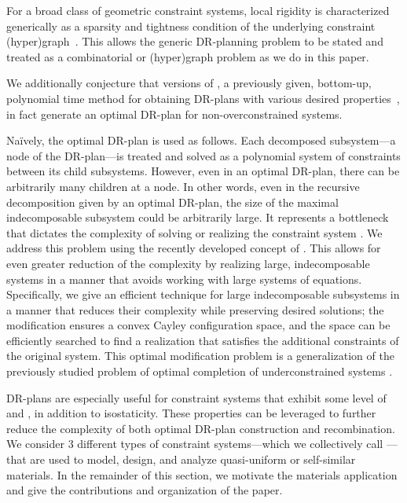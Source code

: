 For a broad class of geometric constraint systems, local rigidity is characterized generically as a sparsity and tightness condition of the underlying constraint (hyper)graph~\cite{laman1970graphs,streinu2009sparse,tay1976rigidity,white1987algebraic}. This allows the generic DR-planning problem to be stated and treated as a combinatorial or (hyper)graph problem as we do in this paper.

We additionally conjecture that versions of \frontier, a previously given, bottom-up, polynomial time method for obtaining DR-plans with various desired properties~\cite{hoffman2001decompositionI, hoffman2001decompositionII,lomonosov2004graph,sitharam2005combinatorial}, in fact generate an optimal DR-plan for non-overconstrained systems.


Na{\"i}vely, the optimal DR-plan is used as follows. Each decomposed subsystem---a node of the DR-plan---is treated and solved as a polynomial system of constraints between its child subsystems. However, even in an optimal DR-plan, there can be arbitrarily many children at a node. In other words, even in the recursive decomposition given by an optimal DR-plan, the  size of the maximal indecomposable subsystem could be arbitrarily large.  It represents a bottleneck that dictates the complexity of solving or realizing the constraint system \cite{sitharam2010optimized,sitharam2006well,sitharam2010reconciling}.  We address this problem using the recently developed concept of  \cite{sitharam2010convex,sitharam2011cayleyI,sitharam2011cayleyII,sitharam2014beast,sitharam2013caymos,wang2014cayley}. This allows for even greater reduction of the complexity by realizing large, indecomposable systems in a manner that avoids working with large systems of equations.
Specifically, we give an efficient technique for  large indecomposable subsystems in a manner that reduces their complexity while preserving desired solutions; the modification ensures a convex Cayley configuration space, and the space can be efficiently searched to find a realization that satisfies the additional constraints of the original system.
This optimal modification  problem is a generalization of the previously studied problem of optimal completion of underconstrained systems \cite{sitharam2005combinatorial,joan-arinyo2003transforming}.

DR-plans are especially useful for constraint systems that exhibit some level of  and , in addition to isostaticity.  These properties can be leveraged to further reduce the complexity of both optimal DR-plan construction and recombination.
We consider 3 different types of constraint systems---which we collectively call ---that are used to model, design, and analyze quasi-uniform or self-similar materials.
In the remainder of this section, we motivate the materials application and give the contributions and organization of the paper.

